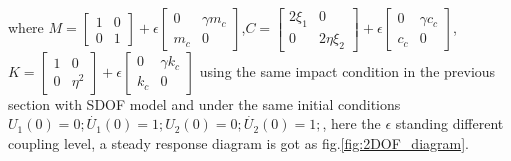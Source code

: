 \documentclass{article}
\begin{document}
where $M=\begin{bmatrix}
1&0\\0&1
\end{bmatrix}+\epsilon \begin{bmatrix}
0& \gamma m_c\\ m_c& 0
\end{bmatrix}$,$C=\begin{bmatrix}
2 \xi_1&0\\0&2 \eta \xi_2
\end{bmatrix}+\epsilon \begin{bmatrix}
0& \gamma c_c\\ c_c& 0
\end{bmatrix}$,$K=\begin{bmatrix}
1&0\\0&\eta^2
\end{bmatrix}+\epsilon \begin{bmatrix}
0& \gamma k_c\\ k_c& 0
\end{bmatrix}$
using the same impact condition in the previous section with SDOF model and under the same initial conditions $U_1(0)=0;\dot{U_1}(0)=1;U_2(0)=0;\dot{U_2}(0)=1;$, here the $\epsilon$  standing different coupling level, a steady response diagram is got as fig.\ref{fig:2DOF_diagram}.
%
\end{document}
